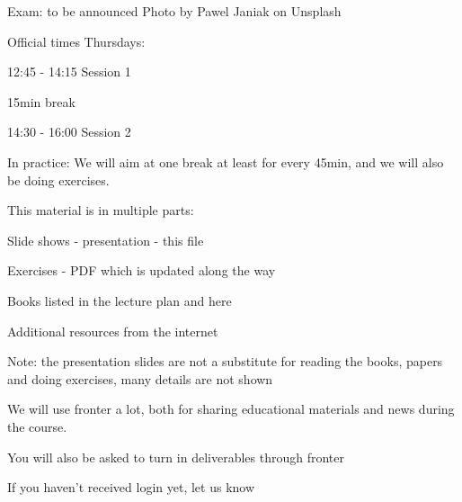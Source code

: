 \documentclass[Screen16to9,17pt]{foils}
\begin{document}
Exam: to be announced \hskip 12cm Photo by Pawel Janiak on Unsplash


Official times Thursdays:
\begin{list2}
\item 12:45 - 14:15 Session 1\\

\item 15min break\\

\item  14:30 - 16:00 Session 2\\
\end{list2}

In practice:
We will aim at one break at least for every 45min, and we will also be doing exercises.



\begin{list1}
\item This material is in multiple parts:
\begin{list2}
\item Slide shows - presentation - this file
\item Exercises - PDF which is updated along the way
\end{list2}
\item Books listed in the lecture plan and here
\item Additional resources from the internet
\end{list1}

Note: the presentation slides are not a substitute for reading the books, papers and doing exercises, many details are not shown




We will use fronter a lot, both for sharing educational materials and news during the course.

You will also be asked to turn in deliverables through fronter


\vskip 5mm
\centerline{If you haven't received login yet, let us know}


\end{document}

